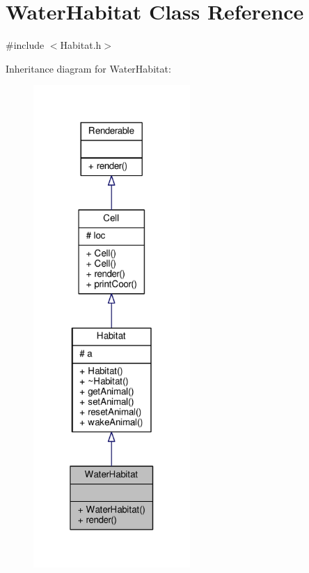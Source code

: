 \hypertarget{classWaterHabitat}{}\section{Water\+Habitat Class Reference}
\label{classWaterHabitat}


{\ttfamily \#include $<$Habitat.\+h$>$}



Inheritance diagram for Water\+Habitat\+:
\nopagebreak
\begin{figure}[H]
\begin{center}
\leavevmode
\includegraphics[width=169pt]{classWaterHabitat__inherit__graph}
\end{center}
\end{figure}


